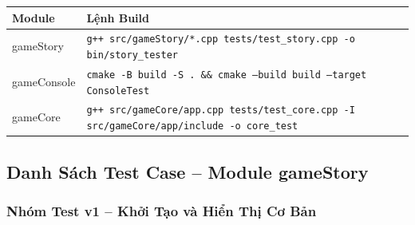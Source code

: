 \documentclass[12pt,a4paper]{article}
\begin{document}
\begin{table}[H]
\centering
{}
\begin{tabularx}{\linewidth}{|l|X|}
\hline
\rowcolor{gray!35}
\textbf{Module} & \textbf{Lệnh Build} \\ \hline
gameStory   & \texttt{g++ src/gameStory/*.cpp tests/test\_story.cpp -o bin/story\_tester} \\ \hline
gameConsole & \texttt{cmake -B build -S . \&\& cmake --build build --target ConsoleTest} \\ \hline
gameCore    & \texttt{g++ src/gameCore/app.cpp tests/test\_core.cpp -I src/gameCore/app/include -o core\_test} \\ \hline
\end{tabularx}
\end{table}

\subsection{Danh Sách Test Case -- Module gameStory}


\newcommand{\tcbox}[2]{%
  \begin{table}[H]
  \centering
  \rowcolors{2}{gray!15}{white}
  \begin{tabularx}{\linewidth}{|l|X|}
  \hline
  \rowcolor{gray!35}
  \multicolumn{2}{|l|}{\textbf{#1}} \\ \hline
  #2
  \end{tabularx}
  \end{table}%
}

\subsubsection{Nhóm Test v1 -- Khởi Tạo và Hiển Thị Cơ Bản}
\end{document}
